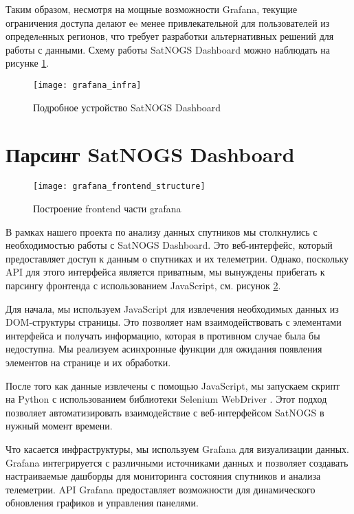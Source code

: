 Таким образом, несмотря на мощные возможности Grafana, текущие ограничения
доступа делают еe менее привлекательной для пользователей из определeнных
регионов, что требует разработки альтернативных решений для работы с данными.
Схему работы SatNOGS Dashboard можно наблюдать на рисунке
\ref{fig:grafana_infra}.

\begin{figure}[htbp]
	\centering
	\texttt{[image: grafana\_infra]}
	\caption{Подробное устройство SatNOGS Dashboard}
	\label{fig:grafana_infra}
\end{figure}

\section{Парсинг SatNOGS Dashboard}
\begin{figure}[htbp]
	\centering
	\texttt{[image: grafana\_frontend\_structure]}
	\caption{Построение frontend части grafana \cite{react_managing_state}}
	\label{fig:grafana_frontend_structure}
\end{figure}

В рамках нашего проекта по анализу данных спутников мы столкнулись с
необходимостью работы с SatNOGS Dashboard. Это веб-интерфейс, который
предоставляет доступ к данным о спутниках и их телеметрии. Однако, поскольку
API для этого интерфейса является приватным, мы вынуждены прибегать к парсингу
фронтенда с использованием JavaScript, см. рисунок
\ref{fig:grafana_frontend_structure}.

Для начала, мы используем JavaScript для извлечения необходимых данных из
DOM-структуры страницы. Это позволяет нам взаимодействовать с элементами
интерфейса и получать информацию, которая в противном случае была бы
недоступна. Мы реализуем асинхронные функции для ожидания появления элементов
на странице и их обработки.

После того как данные извлечены с помощью JavaScript, мы запускаем скрипт на
Python с использованием библиотеки Selenium WebDriver \cite{selenium_docs}.
Этот подход позволяет автоматизировать взаимодействие с веб-интерфейсом SatNOGS
в нужный момент времени.

Что касается инфраструктуры, мы используем Grafana для визуализации данных.
Grafana интегрируется с различными источниками данных и позволяет создавать
настраиваемые дашборды для мониторинга состояния спутников и анализа
телеметрии. API Grafana предоставляет возможности для динамического обновления
графиков и управления панелями.

